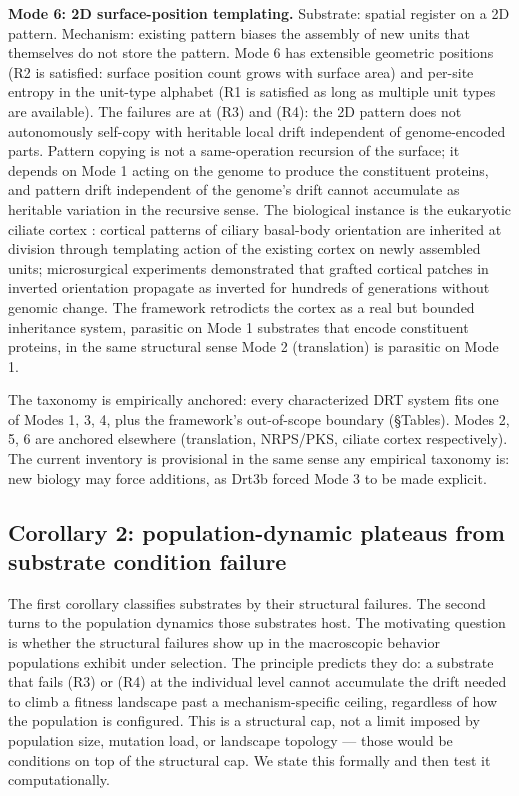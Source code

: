\documentclass[aps,prx,reprint,amsmath,amssymb,floatfix,superscriptaddress,nofootinbib]{revtex4-2}
\theoremstyle{plain-thm}
\theoremstyle{definition-thm}
\begin{document}
\textbf{Mode 6: 2D surface-position templating.} Substrate: spatial register on a 2D pattern. Mechanism: existing pattern biases the assembly of new units that themselves do not store the pattern. Mode 6 has extensible geometric positions (R2 is satisfied: surface position count grows with surface area) and per-site entropy in the unit-type alphabet (R1 is satisfied as long as multiple unit types are available). The failures are at (R3) and (R4): the 2D pattern does not autonomously self-copy with heritable local drift independent of genome-encoded parts. Pattern copying is not a same-operation recursion of the surface; it depends on Mode 1 acting on the genome to produce the constituent proteins, and pattern drift independent of the genome's drift cannot accumulate as heritable variation in the recursive sense. The biological instance is the eukaryotic ciliate cortex \citep{BeissonSonneborn1965, Frankel1989}: cortical patterns of ciliary basal-body orientation are inherited at division through templating action of the existing cortex on newly assembled units; microsurgical experiments demonstrated that grafted cortical patches in inverted orientation propagate as inverted for hundreds of generations without genomic change. The framework retrodicts the cortex as a real but bounded inheritance system, parasitic on Mode 1 substrates that encode constituent proteins, in the same structural sense Mode 2 (translation) is parasitic on Mode 1.

The taxonomy is empirically anchored: every characterized DRT system fits one of Modes 1, 3, 4, plus the framework's out-of-scope boundary (\S Tables). Modes 2, 5, 6 are anchored elsewhere (translation, NRPS/PKS, ciliate cortex respectively). The current inventory is provisional in the same sense any empirical taxonomy is: new biology may force additions, as Drt3b forced Mode 3 to be made explicit.

\subsection{Corollary 2: population-dynamic plateaus from substrate condition failure}

The first corollary classifies substrates by their structural failures. The second turns to the population dynamics those substrates host. The motivating question is whether the structural failures show up in the macroscopic behavior populations exhibit under selection. The principle predicts they do: a substrate that fails (R3) or (R4) at the individual level cannot accumulate the drift needed to climb a fitness landscape past a mechanism-specific ceiling, regardless of how the population is configured. This is a structural cap, not a limit imposed by population size, mutation load, or landscape topology --- those would be conditions on top of the structural cap. We state this formally and then test it computationally.
\end{document}
